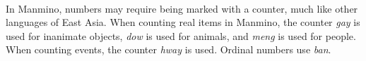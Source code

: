 \documentclass{book}
\begin{document}
            \paragraph{} In Manmino, numbers may require being marked with a counter, much like other languages of East Asia. When counting real items in Manmino, the counter \textit{gay} is used for inanimate objects, \textit{dow} is used for animals, and \textit{meng} is used for people. When counting events, the counter \textit{hway} is used. Ordinal numbers use \textit{ban}.
\end{document}
